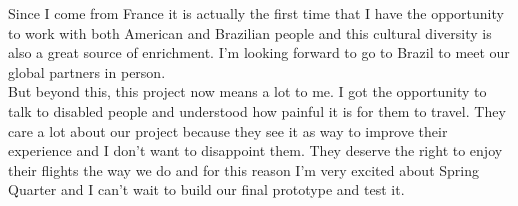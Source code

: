 Since I come from France it is actually the first time that I have the opportunity to work with both American and Brazilian people and this cultural diversity is also a great source of enrichment. I’m looking forward to go to Brazil to meet our global partners in person. \\

But beyond this, this project now means a lot to me. I got the opportunity to talk to disabled people and understood how painful it is for them to travel. They care a lot about our project because they see it as way to improve their experience and I don’t want to disappoint them. They deserve the right to enjoy their flights the way we do and for this reason I’m very excited about Spring Quarter and I can’t wait to build our final prototype and test it.